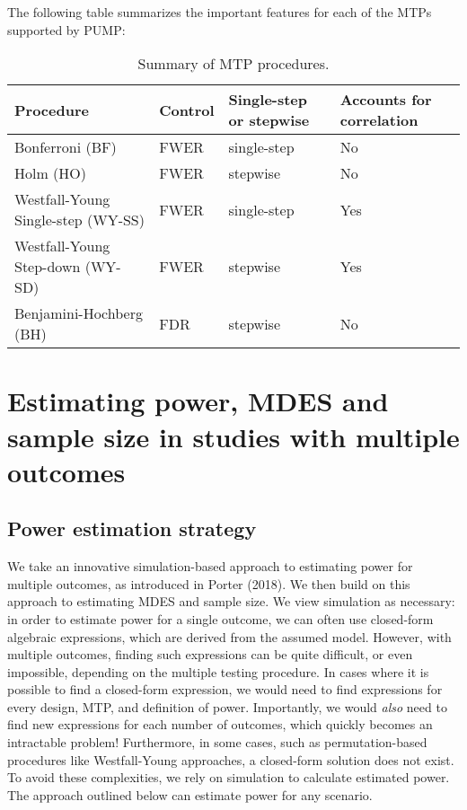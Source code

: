 \documentclass[
]{article}
\begin{document}
The following table summarizes the important features for each of the
MTPs supported by PUMP:

\begin{table}[h!]
\centering
\begin{tabular}{l l l l}
Procedure                             & Control & Single-step or stepwise & Accounts for correlation \\ \hline
Bonferroni (BF)                       & FWER    & single-step             & No                       \\
Holm (HO)                             & FWER    & stepwise                & No\\
Westfall-Young Single-step (WY-SS)    & FWER    & single-step             & Yes\\
Westfall-Young Step-down (WY-SD)      & FWER    & stepwise                & Yes\\
Benjamini-Hochberg (BH)               & FDR     & stepwise                & No
\end{tabular}
\caption{Summary of MTP procedures.}
  \label{tab:mtp}
\end{table}

\section{Estimating power, MDES and sample size in studies with multiple outcomes}
\label{sec:est}

\subsection{Power estimation strategy}
\label{sec:est_power}

We take an innovative simulation-based approach to estimating power for
multiple outcomes, as introduced in Porter (2018). We then build on this
approach to estimating MDES and sample size. We view simulation as
necessary: in order to estimate power for a single outcome, we can often
use closed-form algebraic expressions, which are derived from the
assumed model. However, with multiple outcomes, finding such expressions
can be quite difficult, or even impossible, depending on the multiple
testing procedure. In cases where it is possible to find a closed-form
expression, we would need to find expressions for every design, MTP, and
definition of power. Importantly, we would \emph{also} need to find new
expressions for each number of outcomes, which quickly becomes an
intractable problem! Furthermore, in some cases, such as
permutation-based procedures like Westfall-Young approaches, a
closed-form solution does not exist. To avoid these complexities, we
rely on simulation to calculate estimated power. The approach outlined
below can estimate power for any scenario.
\end{document}
